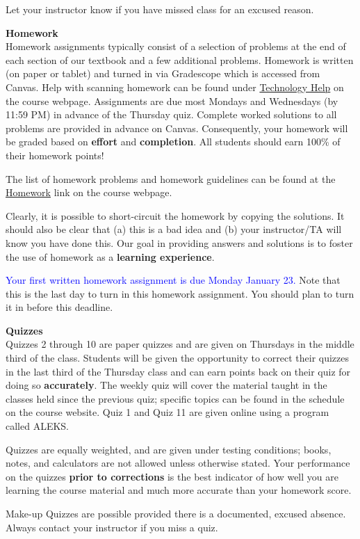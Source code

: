 \documentclass[12pt]{article}
\renewcommand{\emph}[1]{\textsf{\textbf{#1}}}
\newcommand{\localhead}[1]{\par\smallskip\textbf{#1}\nobreak\\}%
\def\heading#1{\localhead{\large\emph{#1}}}
\begin{document}
Let your instructor know if you have missed class for an excused reason.

\heading{Homework}
Homework assignments typically consist of a selection of problems at the end of each section of our textbook and a few additional problems. Homework is written (on paper or tablet) and turned in via Gradescope which is accessed from Canvas.  Help with scanning homework can be found under \href{https://uaf-math251.github.io/techHelp.html}{Technology Help} on the course webpage. Assignments are due most Mondays and Wednesdays (by 11:59 PM) in advance of the Thursday quiz. Complete worked solutions to all problems are provided in advance on Canvas. Consequently, your homework will be graded based on \emph{effort} and \emph{completion}.  All students should earn 100\% of their homework points!

The list of homework problems and homework guidelines can be found at the \href{https://uaf-math251.github.io/newhomework.html}{Homework} link on the course webpage.

Clearly, it is possible to short-circuit the homework by copying the solutions. It should also be clear that (a) this is a bad idea and (b) your instructor/TA will know you have done this. Our goal in providing answers and solutions is to foster the use of homework as a \emph{learning experience}. 

\textcolor{blue}{Your first written homework assignment is due Monday January 23.} Note that this is the last day to turn in this homework assignment. You should plan to turn it in before this deadline.

\heading{Quizzes}
Quizzes 2 through 10 are paper quizzes and are given on Thursdays in the middle third of the class. Students will be given the opportunity to correct their quizzes in the last third of the Thursday class and can earn points back on their quiz for doing so \emph{accurately}. The weekly quiz will cover the material taught in the classes held since the previous quiz; specific topics can be found in the schedule on the course website.  Quiz 1 and Quiz 11 are given online using a program called ALEKS. 

Quizzes are equally weighted, and are given under testing conditions; books, notes, and calculators are not allowed unless otherwise stated. Your performance on the quizzes \emph{prior to corrections} is the best indicator of how well you are learning the course material and much more accurate than your homework score.

Make-up Quizzes are possible provided there is a documented, excused absence. Always contact your instructor if you miss a quiz.
\end{document}
